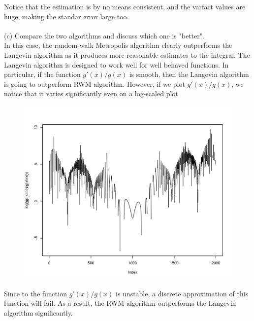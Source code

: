 Notice that the estimation is by no means consistent, and the varfact values are huge, making the standar error large too.\\
\\
(c) Compare the two algorithms and discuss which one is "better".\\
In this case, the random-walk Metropolis algorithm clearly outperforms the Langevin algorithm as it produces more reasonable estimates to the integral. The Langevin algorithm is designed to work well for well behaved functions. In particular, if the function $g'(x)/g(x)$ is smooth, then the Langevin algorithm is going to outperform RWM algorithm. However, if we plot $g'(x)/g(x)$, we notice that it varies significantly even on a log-scaled plot
\begin{figure}[H]
  \centering
\begin{knitrout}
\color{fgcolor}\begin{kframe}
\begin{alltt}
 \hlkwb{=} \hlstd{(}\hlopt{-}\hlstd{,}\hlstd{,}\hlstd{)}
\hlstd{(}\hlstd{(}\hlopt{/}\hlstd{=}\hlstd{)}
\end{alltt}


{\ttfamily\noindent{}}

{\ttfamily\noindent\color{warningcolor}{\#\# Warning in log(gp(xline)/g(xline)): NaNs produced}}\end{kframe}
\includegraphics[width=\maxwidth]{figure/p8cplot-1} 

\end{knitrout}
\end{figure}
Since to the function $g'(x)/g(x)$ is unstable, a discrete approximation of this function will fail. As a result, the RWM algorithm outperforms the Langevin algorithm significantly.
